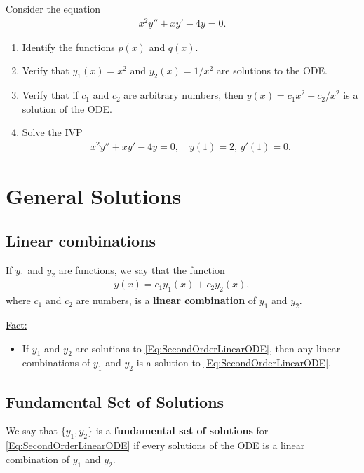 \documentclass[12pt,a4paper]{article}
\newcounter{example}[section]
\begin{document}
\begin{example}\label{Examp:ThirdOne}
Consider the equation
	\begin{align*}
	x^2 y'' + x y' - 4 y = 0 .
	\end{align*}
	\begin{enumerate}[label=\alph*)]
	\item Identify the functions $p(x)$ and $q(x)$.
	\item Verify that $y_1 (x) = x^2$ and $y_2 (x) = 1/x^2$ are solutions to the ODE.
	\item Verify that if $c_1$ and $c_2$ are arbitrary numbers, then $y(x) = c_1 x^2 + c_2 /x^2$ is a solution of the ODE.
	\item Solve the IVP
		\begin{align*}
		x^2 y'' + x y' - 4y = 0, \quad y(1) = 2 , \, y'(1) = 0 .
		\end{align*}
	\end{enumerate}
\end{example}

\newpage

\section{General Solutions}

\subsection{Linear combinations}

If $y_1$ and $y_2$ are functions, we say that the function
	\begin{align*}
	y(x) = c_1 y_1 (x) + c_2 y_2 (x) ,
	\end{align*}
where $c_1$ and $c_2$ are numbers, is a \textbf{linear combination} of $y_1$ and $y_2$.

	\underline{Fact:}
	\begin{itemize}
	\item If $y_1$ and $y_2$ are solutions to \eqref{Eq:SecondOrderLinearODE}, then any linear combinations of $y_1$ and $y_2$ is a solution to \eqref{Eq:SecondOrderLinearODE}.
	\end{itemize}
	
\subsection{Fundamental Set of Solutions}

We say that $\{ y_1 , y_2 \}$ is a \textbf{fundamental set of solutions} for \eqref{Eq:SecondOrderLinearODE} if every solutions of the ODE is a linear combination of $y_1$ and $y_2$. 
	
\end{document}
